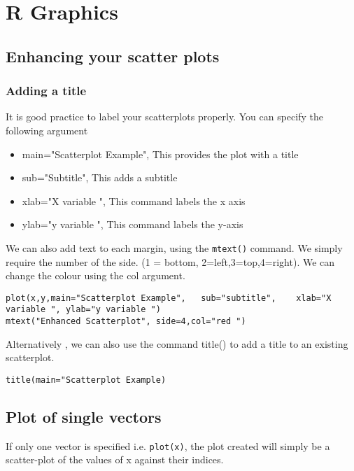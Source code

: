 \chapter{ R Graphics}
\section{Enhancing your scatter plots}



\begin{frame}
\subsection{Adding a title }

It is good practice to label your scatterplots properly. You can specify the following argument
\begin{itemize}
	\item	main="Scatterplot Example", 	This provides the plot with a title
	\item	sub="Subtitle",                 This adds a subtitle
	\item	xlab="X variable ",				This command labels the x axis 
	\item   ylab="y variable ",				This command labels the y-axis
\end{itemize}
We can also add text to each margin, using the \texttt{mtext()} command.  
We simply require the number of the side. (1 = bottom, 2=left,3=top,4=right). 
We can change the colour using the col argument.
\footnotesize \begin{verbatim}
plot(x,y,main="Scatterplot Example",   sub="subtitle",    xlab="X variable ", ylab="y variable ")	
mtext("Enhanced Scatterplot", side=4,col="red ")
\end{verbatim}\normalsize
Alternatively , we can also use the command title() to add a title to an existing scatterplot.
\footnotesize \begin{verbatim}
title(main="Scatterplot Example)	
\end{verbatim}\normalsize


\section{Plot of single vectors}
If only one vector is specified i.e. \texttt{plot(x)},  the plot created will simply be a scatter-plot of the values of x against their indices.


\end{frame}
